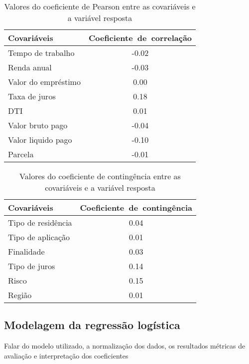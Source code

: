 \begin{table}[H]
  \centering
  \begin{tabular}{lc}
    \hline
    \textbf{Covariáveis} & \mbox{\textbf{Coeficiente de correlação}} \\ 
    \hline
    Tempo de trabalho & -0.02 \\ 
    Renda anual & -0.03 \\ 
    Valor do empréstimo & 0.00 \\ 
    Taxa de juros & 0.18 \\ 
    DTI & 0.01 \\ 
    Valor bruto pago & -0.04 \\ 
    Valor liquido pago & -0.10 \\ 
    Parcela & -0.01 \\ 
    \hline
  \end{tabular}
  \caption{Valores do coeficiente de Pearson entre as covariáveis e a variável resposta}
  \label{tab:coef_corr}
  \end{table}
  
\begin{table}[H]
  \centering
  \begin{tabular}{lc}
    \hline
    \textbf{Covariáveis} & \mbox{\textbf{Coeficiente de contingência}} \\ 
    \hline
    Tipo de residência & 0.04 \\ 
    Tipo de aplicação & 0.01 \\ 
    Finalidade & 0.03 \\ 
    Tipo de juros & 0.14 \\ 
    Risco & 0.15 \\ 
    Região & 0.01 \\ 
     \hline
  \end{tabular}
  \caption{Valores do coeficiente de contingência entre as covariáveis e a variável resposta}
  \label{tab:coef_cont}
\end{table}

\subsection*{Modelagem da regressão logística}
Falar do modelo utilizado, a normalização dos dados, os resultados
métricas de avaliação e interpretação dos coeficientes


